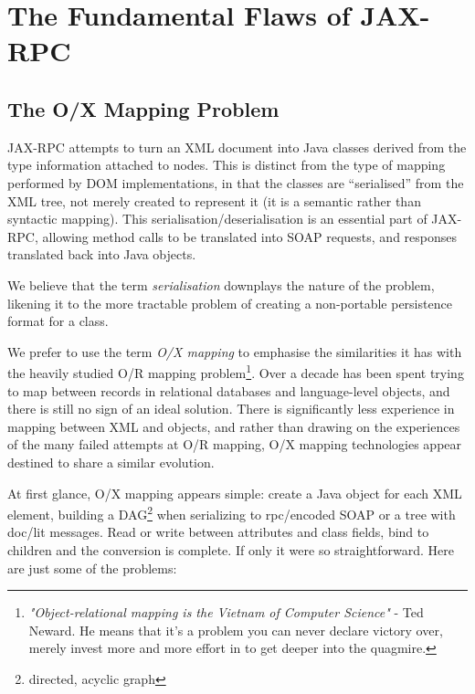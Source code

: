 \section{The Fundamental Flaws of JAX-RPC}
\label{objections}

\subsection{The O/X Mapping Problem}
\label{objections:o-x}

JAX-RPC attempts to turn an XML document into Java classes derived from the type
information attached to nodes. This is distinct from the type of mapping
performed by DOM implementations, in that the classes are ``serialised'' from
the XML tree, not merely created to represent it (it is a semantic rather than
syntactic mapping). This serialisation/deserialisation is an essential part of
JAX-RPC, allowing method calls to be translated into SOAP requests, and
responses translated back into Java objects.

We believe that the term \emph{serialisation} downplays the nature of
the problem, likening it to the more tractable problem of creating a
non-portable persistence format for a class. 

We prefer to use the term \emph{O/X mapping} to emphasise the
similarities it has with the heavily studied O/R mapping
problem\footnote{ \emph{"Object-relational mapping is the Vietnam of
Computer Science"} - Ted Neward. He means that it's a problem you can
never declare victory over, merely invest more and more effort in to
get deeper into the quagmire.
}. 
Over a decade has been spent trying to map between records in relational
databases and language-level objects, and there is still no sign of an ideal
solution. There is significantly less experience in mapping between XML and
objects, and rather than drawing on the experiences of the many failed attempts
at O/R mapping, O/X mapping technologies appear destined to share a similar
evolution.

At first glance, O/X mapping appears simple: create a Java object
for each XML element, building a DAG\footnote{directed, acyclic graph}
when serializing to rpc/encoded SOAP or a tree with doc/lit
messages. Read or write between attributes and class fields, bind to
children and the conversion is complete. If only it were so
straightforward. Here are just some of the problems:


